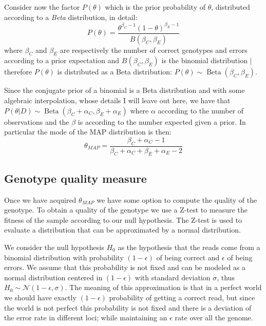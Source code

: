 \documentclass{article}
\DeclareMathOperator*{\betadist}{Beta}
\begin{document}
Consider now the factor $P(\theta)$ which is the prior probability of
$\theta$, distributed according to a \textit{Beta} distribution, in
detail:
\begin{equation*}
  P(\theta) = \dfrac{\theta^{\beta_{C}-1} (1 - \theta)^{\beta_{E}-1}}
  {B(\beta_{C},\beta_{E})}
\end{equation*}
where $\beta_{C}$ and $\beta_{E}$ are respectively the number of
correct genotypes and errors according to a prior expectation and
$B(\beta_{C},\beta_{E})$ is the binomial distribution | therefore
$P(\theta)$ is distributed as a Beta distribution:
$P(\theta) \sim \betadist(\beta_{C},\beta_{E})$.

Since the conjugate prior of a binomial is a Beta distribution and
with some algebraic interpolation, whose details I will leave out
here, we have that
$P(\theta | D) \sim \betadist(\beta_{C} + \alpha_{C},\beta_{E} +
\alpha_{E})$ where $\alpha$ according to the number of observations
and the $\beta$ is according to the number expected given a prior.
In particular the mode of the MAP distribution is then:
\begin{equation}
  \theta_{MAP} = \dfrac{\beta_{C} + \alpha_{C} - 1}
  {\beta_{C} + \alpha_{C} + \beta_{E} + \alpha_{E} - 2}
  \label{eq:MAP}
\end{equation}

\subsection{Genotype quality measure}
Once we have acquired $\theta_{MAP}$ we have some option to compute
the quality of the genotype.  To obtain a quality of the genotype we
use a Z-test to measure the fitness of the sample according to our
null hypothesis.  The Z-test is used to evaluate a distribution that
can be approximated by a normal distribution.

We consider the null hypothesis $H_0$ as the hypothesis that the reads
come from a binomial distribution with probability $(1-\epsilon)$ of
being correct and $\epsilon$ of being errors.  We assume that this
probability is not fixed and can be modeled as a normal distribution
centered in $(1-\epsilon)$ with standard deviation $\sigma$, thus
$H_0 \sim \mathcal{N}(1-\epsilon, \sigma)$.  The meaning of this
approximation is that in a perfect world we should have exactly
$(1-\epsilon)$ probability of getting a correct read, but since the
world is not perfect this probability is not fixed and there is a
deviation of the error rate in different loci; while maintaining an
$\epsilon$ rate over all the genome.
\end{document}
